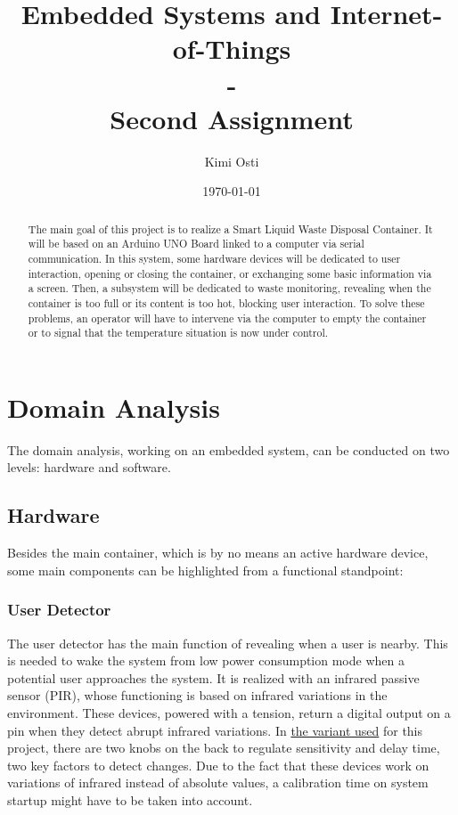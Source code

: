 \documentclass[a4paper,12pt]{report}
\title{Embedded Systems and Internet-of-Things \\ - \\ Second Assignment}
\author{Kimi Osti}
\date{\today}
\begin{document}
	
	\maketitle
	
	\begin{abstract}
		The main goal of this project is to realize a Smart Liquid Waste Disposal Container. It will be based on an Arduino UNO Board linked to a computer via serial communication. In this system, some hardware devices will be dedicated to user interaction, opening or closing the container, or exchanging some basic information via a screen. Then, a subsystem will be dedicated to waste monitoring, revealing when the container is too full or its content is too hot, blocking user interaction. To solve these problems, an operator will have to intervene via the computer to empty the container or to signal that the temperature situation is now under control.
	\end{abstract}
	
	\tableofcontents
	
	\chapter{Domain Analysis}
	The domain analysis, working on an embedded system, can be conducted on two levels: hardware and software.
	
	\section{Hardware}
	Besides the main container, which is by no means an active hardware device, some main components can be highlighted from a functional standpoint:
	
	\subsection{User Detector}
	The user detector has the main function of revealing when a user is nearby. This is needed to wake the system from low power consumption mode when a potential user approaches the system.\newline
	It is realized with an infrared passive sensor (PIR), whose functioning is based on infrared variations in the environment. These devices, powered with a tension, return a digital output on a pin when they detect abrupt infrared variations. In \href{https://learn.adafruit.com/pir-passive-infrared-proximity-motion-sensor/}{the variant used} for this project, there are two knobs on the back to regulate sensitivity and delay time, two key factors to detect changes. Due to the fact that these devices work on variations of infrared instead of absolute values, a calibration time on system startup might have to be taken into account.
	
\end{document}
